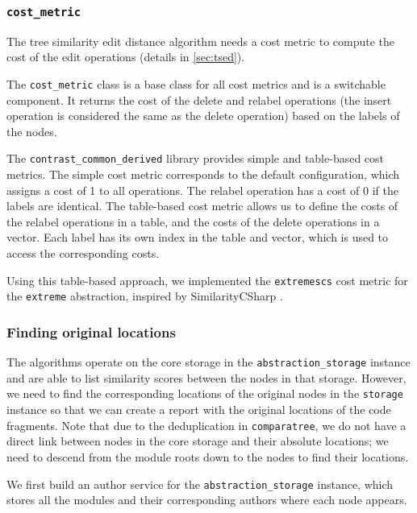 \subsubsection{\texttt{cost\_metric}}\label{sec:cost-metric}

The tree similarity edit distance algorithm needs a cost metric to compute the cost of the edit operations (details in \autoref{sec:tsed}).

The \texttt{cost\_metric} class is a base class for all cost metrics and is a switchable component.
It returns the cost of the delete and relabel operations (the insert operation is considered the same as the delete operation) based on the labels of the nodes.

The \texttt{contrast\_common\_derived} library provides simple and table-based cost metrics.
The simple cost metric corresponds to the default configuration, which assigns a cost of 1 to all operations. The relabel operation has a cost of 0 if the labels are identical.
The table-based cost metric allows us to define the costs of the relabel operations in a table, and the costs of the delete operations in a vector.
Each label has its own index in the table and vector, which is used to access the corresponding costs.

Using this table-based approach, we implemented the \texttt{extremescs} cost metric for the \texttt{extreme} abstraction, inspired by SimilarityCSharp \cite{similaritycsharp}.

\subsubsection{Finding original locations}

The algorithms operate on the core storage in the \texttt{abstraction\_storage} instance and are able to list similarity scores between the nodes in that storage.
However, we need to find the corresponding locations of the original nodes in the \texttt{storage} instance so that we can create a report with the original locations of the code fragments.
Note that due to the deduplication in \texttt{comparatree}, we do not have a direct link between nodes in the core storage and their absolute locations; we need to descend from the module roots down to the nodes to find their locations.

We first build an author service for the \texttt{abstraction\_storage} instance, which stores all the modules and their corresponding authors where each node appears.

